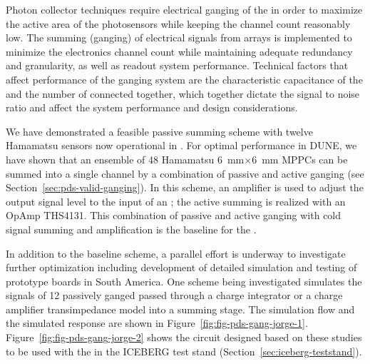 Photon collector techniques require electrical ganging of the  in order to maximize the active area of the photosensors while keeping the channel count reasonably low. The summing (ganging) of electrical signals from  arrays is implemented to minimize the electronics channel count while maintaining adequate redundancy and granularity, as well as readout system performance.  Technical factors that affect performance of the ganging system are the characteristic capacitance of the  and the number of  connected together, which together dictate the signal to noise ratio and affect the system performance and design considerations.

We have demonstrated a feasible passive summing scheme with twelve Hamamatsu  sensors now operational in . For optimal performance in DUNE, we have shown that an ensemble of 48 Hamamatsu \SI{6}{mm}$\times$\SI{6}{mm} MPPCs can be summed into a single channel by a combination of passive and active ganging (see Section~\ref{sec:pds-valid-ganging}).  In this scheme, an amplifier is used to adjust the  output signal level to the input of an ; the active summing is realized with an OpAmp THS4131. This combination of passive and active ganging with cold signal summing and amplification is the baseline for the .


In addition to the baseline scheme, a parallel effort is underway to investigate further optimization including development of detailed simulation and testing of prototype boards in South America. One scheme being investigated simulates the signals of 12 passively ganged  passed through a charge integrator or a charge amplifier transimpedance model into a summing stage. The simulation flow and the simulated response are shown in 
Figure~\ref{fig:fig-pds-gang-jorge-1}. Figure~\ref{fig:fig-pds-gang-jorge-2} shows the circuit designed based on these studies to be used with the  in the ICEBERG test stand (Section~\ref{sec:iceberg-teststand}).

